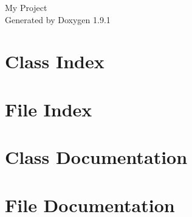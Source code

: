 \let\mypdfximage\pdfximage\def\pdfximage{\immediate\mypdfximage}\documentclass[twoside]{book}
\newcommand{\+}{\discretionary{\mbox{\scriptsize$\hookleftarrow$}}{}{}}
\newcommand{\clearemptydoublepage}{%
  \newpage{\pagestyle{empty}\cleardoublepage}%
}
\begin{document}
\raggedbottom

\hypersetup{pageanchor=false,
             bookmarksnumbered=true,
             pdfencoding=unicode
            }
\begin{titlepage}
\vspace*{7cm}
\begin{center}%
{\Large My Project }\\
\vspace*{1cm}
{\large Generated by Doxygen 1.9.1}\\
\end{center}
\end{titlepage}
\clearemptydoublepage
{}
\tableofcontents
\clearemptydoublepage
{}
\hypersetup{pageanchor=true}

\chapter{Class Index}

\chapter{File Index}

\chapter{Class Documentation}

\chapter{File Documentation}







\backmatter
\newpage
{}
\clearemptydoublepage
{}
\printindex
\end{document}
